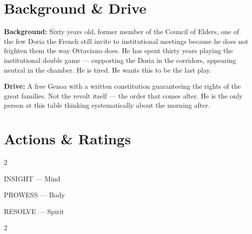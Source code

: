 \clearpage



\section*{Background \& Drive}
\begin{rulebox}{}
\textbf{Background:} Sixty years old, former member of the Council of Elders, one of
the few Doria the French still invite to institutional meetings because he does not
frighten them the way Ottaviano does. He has spent thirty years playing the institutional
double game --- supporting the Doria in the corridors, appearing neutral in the chamber.
He is tired. He wants this to be the last play.

\medskip\noindent\textcolor{DoriaBlue}{\textbf{Drive:}} A free Genoa with a written
constitution guaranteeing the rights of the great families. Not the revolt itself ---
the order that comes after. He is the only person at this table thinking systematically
about the morning after.
\end{rulebox}

\section*{Actions \& Ratings}
\begin{multicols}{2}
\begin{attributoblock}[DoriaBlue]{INSIGHT --- Mind}
\end{attributoblock}
\begin{attributoblock}[DoriaBlue]{PROWESS --- Body}
\end{attributoblock}
\end{multicols}
\begin{attributoblock}[DoriaBlue]{RESOLVE --- Spirit}
  \begin{multicols}{2}
  \end{multicols}
\end{attributoblock}

